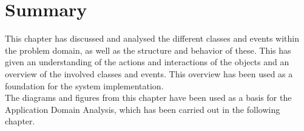 \section{Summary} \label{ssc:pd_summary}
This chapter has discussed and analysed the different classes and events within the problem domain, as well as the structure and behavior of these. This has given an understanding of the actions and interactions of the objects and an overview of the involved classes and events. This overview has been used as a foundation for the system implementation.\\
The diagrams and figures from this chapter have been used as a basis for the Application Domain Analysis, which has been carried out in the following chapter.